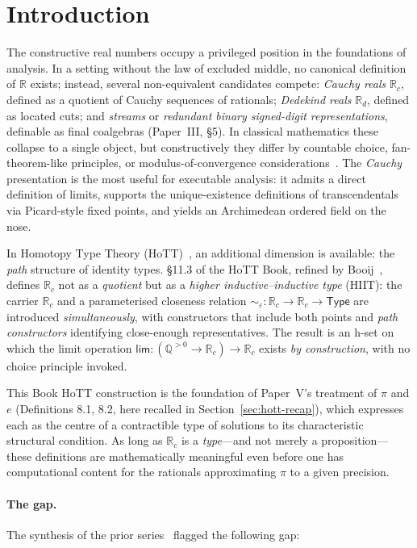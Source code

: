 \documentclass[12pt]{article}
\theoremstyle{definition}
\theoremstyle{remark}
\newcommand{\Type}{\mathsf{Type}}
\newcommand{\R}{\mathbb{R}}
\newcommand{\Q}{\mathbb{Q}}
\newcommand{\Rc}{\mathbb{R}_{c}}
\newcommand{\Rd}{\mathbb{R}_{d}}
\newcommand{\hlim}{\mathsf{lim}}
\newcommand{\close}{\mathrel{\sim}}
\begin{document}
\tableofcontents

\section{Introduction}
\label{sec:intro}

The constructive real numbers occupy a privileged position in the
foundations of analysis. In a setting without the law of excluded middle,
no canonical definition of $\R$ exists; instead, several non-equivalent
candidates compete: \emph{Cauchy reals} $\Rc$, defined as a quotient of
Cauchy sequences of rationals; \emph{Dedekind reals} $\Rd$, defined as
located cuts; and \emph{streams} or \emph{redundant binary signed-digit
representations}, definable as final coalgebras (Paper~III, \S 5). In
classical mathematics these collapse to a single object, but constructively
they differ by countable choice, fan-theorem-like principles, or
modulus-of-convergence considerations~\cite{BridgesRichman}. The
\emph{Cauchy} presentation is the most useful for executable analysis: it
admits a direct definition of limits, supports the unique-existence
definitions of transcendentals via Picard-style fixed points, and yields
an Archimedean ordered field on the nose.

In Homotopy Type Theory (HoTT)~\cite{HoTTBook}, an additional dimension is
available: the \emph{path} structure of identity types. \S 11.3 of the
HoTT Book, refined by Booij~\cite{Booij2020}, defines $\Rc$ not as a
\emph{quotient} but as a \emph{higher inductive--inductive type} (HIIT):
the carrier $\Rc$ and a parameterised closeness relation
$\close_{\varepsilon} : \Rc \to \Rc \to \Type$ are introduced
\emph{simultaneously}, with constructors that include both points and
\emph{path constructors} identifying close-enough representatives. The
result is an h-set on which the limit operation
$\hlim : (\Q^{>0} \to \Rc) \to \Rc$ exists \emph{by construction}, with no
choice principle invoked.

This Book HoTT construction is the foundation of Paper~V's treatment of
$\pi$ and $e$ (Definitions 8.1, 8.2, here recalled in Section~\ref{sec:hott-recap}),
which expresses each as the centre of a contractible type of solutions to
its characteristic structural condition. As long as $\Rc$ is a
\emph{type}---and not merely a proposition---these definitions are
mathematically meaningful even before one has computational content for
the rationals approximating $\pi$ to a given precision.

\paragraph{The gap.}
The synthesis of the prior series~\cite[\S 8, item~6]{SynthesisHoTT} flagged the following gap:
\end{document}
